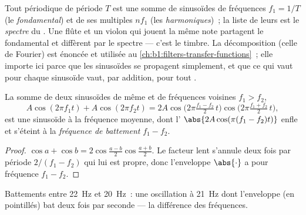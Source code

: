 \begin{remark}[Spectre]\label{rem:b1:wave-propagation:spectrum}
Tout  périodique de période $T$ est une somme de sinusoïdes de
fréquences $f_1 = 1/T$ (le \emph{fondamental}) et de ses multiples
$nf_1$ (les \emph{harmoniques})~; la liste de leurs  est le
\emph{spectre} du . Une flûte et un violon qui jouent la même note
partagent le fondamental et diffèrent par le spectre --- c'est le
timbre. La décomposition (celle de Fourier) est énoncée et utilisée au
\cref{ch:b1:filters-transfer-functions}~; elle importe ici parce que les
sinusoïdes se propagent simplement, et que ce qui vaut pour chaque
sinusoïde vaut, par addition, pour tout .
\end{remark}

\begin{proposition}[Battements]\label{prop:b1:wave-propagation:beats}
La somme de deux sinusoïdes de même  et de fréquences voisines
$f_1 > f_2$,
\[
A\cos(2\pi f_1 t) + A\cos(2\pi f_2 t)
= 2A\cos\!\big(2\pi\tfrac{f_1 - f_2}{2}\,t\big)\cos\!\big(2\pi\tfrac{f_1 + f_2}{2}\,t\big),
\]
est une sinusoïde à la fréquence moyenne, dont l'
$\abs{2A\cos(\pi(f_1 - f_2)t)}$ enfle et s'éteint à la \emph{fréquence
de battement} $f_1 - f_2$.
\end{proposition}

\begin{proof}
$\cos a + \cos b = 2\cos\frac{a - b}{2}\cos\frac{a + b}{2}$. Le facteur
lent s'annule deux fois par période $2/(f_1 - f_2)$ qui lui est propre,
donc l'enveloppe $\abs{\cdot}$ a pour fréquence $f_1 - f_2$.
\end{proof}

\begin{omfigure}

{\small Battements entre \qty{22}{Hz} et \qty{20}{Hz}~: une oscillation
à \qty{21}{Hz} dont l'enveloppe (en pointillés) bat deux fois par
seconde --- la différence des fréquences.}
\end{omfigure}

